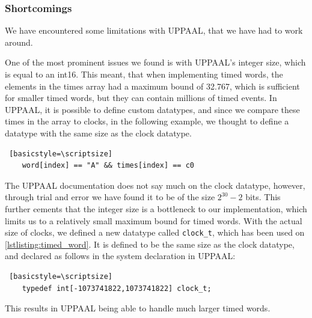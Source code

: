 \subsubsection{Shortcomings}\label{subsubsec:shortcomings}
We have encountered some limitations with UPPAAL, that we have had to work around.

\vspace{.5\baselineskip plus 2pt}
One of the most prominent issues we found is with UPPAAL's integer size, which is equal to an int16. This meant, that when implementing timed words, the elements in the times array had a maximum bound of 32.767, which is sufficient for smaller timed words, but they can contain millions of timed events. In UPPAAL, it is possible to define custom datatypes, and since we compare these times in the array to clocks, in the following example, we thought to define a datatype with the same size as the clock datatype.

\begin{lstlisting} [basicstyle=\scriptsize]
    word[index] == "A" && times[index] == c0
\end{lstlisting}

The UPPAAL documentation does not say much on the clock datatype, however, through trial and error we have found it to be of the size $2^{30}-2$ bits.
This further cements that the integer size is a bottleneck to our implementation, which limits us to a relatively small maximum bound for timed words.
With the actual size of clocks, we defined a new datatype called \verb|clock_t|, which has been used on \cref{lstlisting:timed_word}. It is defined to be the same size as the clock datatype, and declared as follows in the system declaration in UPPAAL:

\begin{lstlisting} [basicstyle=\scriptsize]
    typedef int[-1073741822,1073741822] clock_t;
\end{lstlisting}

This results in UPPAAL being able to handle much larger timed words.

